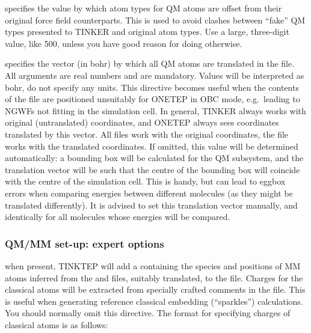 \documentclass[letterpaper,10pt,english]{sphinxmanual}
\begin{document}
  \textendash{} specifies
the value by which atom types for QM atoms are offset from their
original force field counterparts. This is used to avoid clashes between
“fake” QM types presented to TINKER and original atom types. Use a
large, three-digit value, like 500, unless you have good reason for
doing otherwise.

  \textendash{} specifies the
vector (in bohr) by which all QM atoms are translated in the 
file. All arguments are real numbers and are mandatory. Values will be
interpreted as bohr, do not specify any units. This directive becomes
useful when the contents of the  file are positioned unsuitably
for ONETEP in OBC mode, e.g. leading to NGWFs not fitting in the
simulation cell. In general, TINKER always works with original
(untranslated) coordinates, and ONETEP always sees coordinates
translated by this vector. All  files work with the original
coordinates, the  file works with the translated coordinates. If
omitted, this value will be determined automatically: a bounding box
will be calculated for the QM subsystem, and the translation vector will
be such that the centre of the bounding box will coincide with the
centre of the simulation cell. This is handy, but can lead to eggbox
errors when comparing energies between different molecules (as they
might be translated differently). It is advised to set this translation
vector manually, and identically for all molecules whose energies will
be compared.


\subsubsection{QM/MM set-up: expert options}
\label{\detokenize{tinktep:qm-mm-set-up-expert-options}}
  \textendash{} when present,
TINKTEP will add a  containing the species and
positions of MM atoms inferred from the  and  files,
suitably translated, to the  file. Charges for the classical
atoms will be extracted from specially crafted comments in the
 file. This is useful when generating reference
classical embedding (“sparkles”) calculations. You should normally omit
this directive. The format for specifying charges of classical atoms is
as follows:
\end{document}
